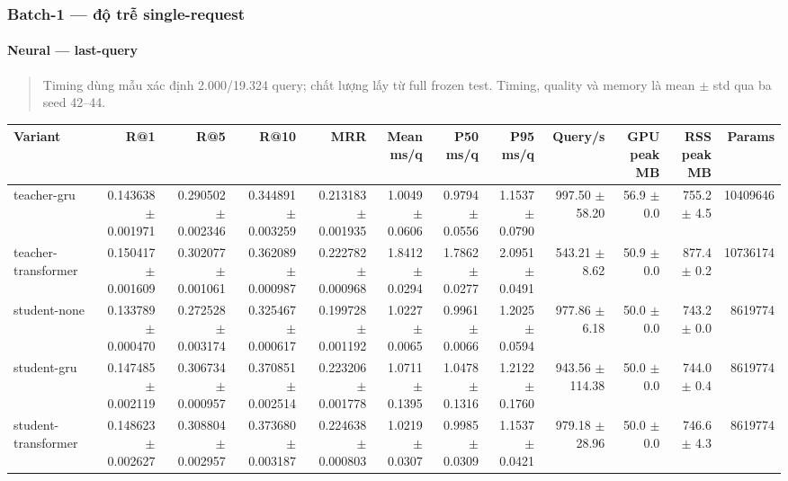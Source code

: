 \subsubsection*{Batch-1 --- độ trễ single-request}

\paragraph{Neural --- last-query}

\begin{quote}\small Timing dùng mẫu xác định 2.000/19.324 query; chất lượng lấy từ full frozen test. Timing, quality và memory là mean $\pm$ std qua ba seed 42--44.\end{quote}
\begin{table}[!htbp]
\centering
\scriptsize
\setlength{\tabcolsep}{2.5pt}
\begin{adjustbox}{max width=\textwidth}
\begin{tabular}{@{}lrrrrrrrrrrr@{}}
\toprule
Variant & R@1 & R@5 & R@10 & MRR & Mean ms/q & P50 ms/q & P95 ms/q & Query/s & GPU peak MB & RSS peak MB & Params \\
\midrule
teacher-gru & 0.143638 $\pm$ 0.001971 & 0.290502 $\pm$ 0.002346 & 0.344891 $\pm$ 0.003259 & 0.213183 $\pm$ 0.001935 & 1.0049 $\pm$ 0.0606 & 0.9794 $\pm$ 0.0556 & 1.1537 $\pm$ 0.0790 & 997.50 $\pm$ 58.20 & 56.9 $\pm$ 0.0 & 755.2 $\pm$ 4.5 & 10409646 \\
teacher-transformer & 0.150417 $\pm$ 0.001609 & 0.302077 $\pm$ 0.001061 & 0.362089 $\pm$ 0.000987 & 0.222782 $\pm$ 0.000968 & 1.8412 $\pm$ 0.0294 & 1.7862 $\pm$ 0.0277 & 2.0951 $\pm$ 0.0491 & 543.21 $\pm$ 8.62 & 50.9 $\pm$ 0.0 & 877.4 $\pm$ 0.2 & 10736174 \\
student-none & 0.133789 $\pm$ 0.000470 & 0.272528 $\pm$ 0.003174 & 0.325467 $\pm$ 0.000617 & 0.199728 $\pm$ 0.001192 & 1.0227 $\pm$ 0.0065 & 0.9961 $\pm$ 0.0066 & 1.2025 $\pm$ 0.0594 & 977.86 $\pm$ 6.18 & 50.0 $\pm$ 0.0 & 743.2 $\pm$ 0.0 & 8619774 \\
student-gru & 0.147485 $\pm$ 0.002119 & 0.306734 $\pm$ 0.000957 & 0.370851 $\pm$ 0.002514 & 0.223206 $\pm$ 0.001778 & 1.0711 $\pm$ 0.1395 & 1.0478 $\pm$ 0.1316 & 1.2122 $\pm$ 0.1760 & 943.56 $\pm$ 114.38 & 50.0 $\pm$ 0.0 & 744.0 $\pm$ 0.4 & 8619774 \\
student-transformer & 0.148623 $\pm$ 0.002627 & 0.308804 $\pm$ 0.002957 & 0.373680 $\pm$ 0.003187 & 0.224638 $\pm$ 0.000803 & 1.0219 $\pm$ 0.0307 & 0.9985 $\pm$ 0.0309 & 1.1537 $\pm$ 0.0421 & 979.18 $\pm$ 28.96 & 50.0 $\pm$ 0.0 & 746.6 $\pm$ 4.3 & 8619774 \\
\bottomrule
\end{tabular}
\end{adjustbox}
\end{table}

